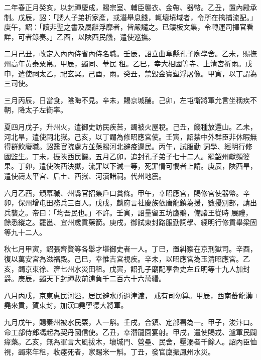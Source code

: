 \begin{pinyinscope}
 二年春正月癸亥，以封禪慶成，賜宗室、輔臣襲衣、金帶、器幣。乙丑，置內殿承制。戊辰，詔：「誘人子弟析家產，或潛舉息錢，輒壞墳域者，令所在擒捕流配。」庚午，詔：「讀非聖之書及屬辭浮靡者，皆嚴譴之。已鏤板文集，令轉運司擇官看詳，可者錄奏。」乙酉，以陜西民饑，遣使巡撫。



 二月己丑，改定入內內侍省內侍名職。壬辰，詔立曲阜縣孔子廟學舍。乙未，賜撫州高年黃泰粟帛。甲辰，蠲同、華民
 租。乙巳，幸大相國等寺、上清宮祈雨。戊申，遣使祠太乙，祀玄冥。己酉，雨。癸丑，禁毀金寶塑浮屠像。甲寅，以丁謂為三司使。



 三月丙辰，日當食，陰晦不見。辛未，賜京城酺。己卯，左屯衛將軍允言坐稱疾不朝，降太子左衛率。



 夏四月戊子，升州火，遣御史訪民疾苦，蠲被火屋稅。己丑，餞種放還山。乙未，河北旱，遣使祠北嶽。己亥，以丁謂為修昭應宮使。壬寅，詔禁中外群臣非休暇無得群飲廢職。詔醫官院處方並藥賜河北避疫邊民。丙午，試服勤
 詞學、經明行修國監生。丁未，振陜西民饑。五月乙卯，追封孔子弟子七十二人。罷韶州獻頻婆果。丁卯，遣使陜西決獄，流罪以下減一等，死罪情可憫者上請。庚辰，陜西旱，遣使禱太平宮、后土、西嶽、河瀆諸祠。代州地震。



 六月乙酉，頒幕職、州縣官招集戶口賞條。甲午，幸昭應宮，賜修宮使器幣。辛卯，保州增屯田務兵三百人。戊戌，麟府言社慶族依唐龍鎮為援，數擾別部，請出兵襲之。帝曰：「均吾民也。」不許。壬寅，詔量留五坊鷹鶻，備諸王從時
 展禮，餘悉縱之。罷邕、宜州歲貢藥箭。庚戌，御試東封路服勤詞學、經明行修貢舉梁固等九十二人。



 秋七月甲寅，詔張齊賢等各舉才堪御史者一人。丁巳，置糾察在京刑獄司。辛酉，復以萬安宮為滋福殿。己巳，幸惟吉宮視疾。辛未，以昭應宮為玉清昭應宮。乙亥，蠲京東徐、濟七州水災田租。戊寅，詔孔子廟配享魯史左丘明等十九人加封爵。庚辰，蠲天下封禪赦前逋負千二百六十六萬緡。



 八月丙戌，京東惠民河溢，居民避水所過津渡，
 戒有司勿算。甲辰，西南蕃龍漢□堯來貢，賀東封，加漢□堯寧德大將軍。



 九月戊午，賜秦州被水民粟，人一斛。壬戌，合鎮、定部署為一。甲子，浚汴口。命工部侍郎馮起為契丹國信使。乙丑，幸潛龍園宴射。甲戌，遣使賜戎、瀘軍民闢瘴藥。乙亥，無為軍言大風拔木，壞城門、營壘、民舍，壓溺者千餘人。詔內臣恤視，蠲來年租，收瘞死者，家賜米一斛。丁丑，發官廩振鳳州水災。




\end{pinyinscope}
